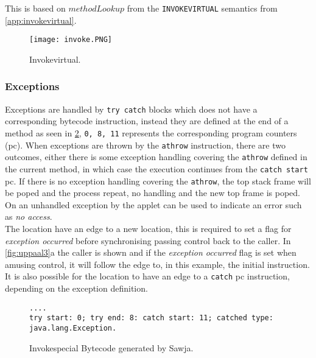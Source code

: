 This is based on $methodLookup$ from the \texttt{INVOKEVIRTUAL} semantics from \cref{app:invokevirtual}.

 
\begin{figure}[H]
\centering
\texttt{[image: invoke.PNG]}
\caption{Invokevirtual.}
\label{fig:invokevirtual}
\end{figure}

\subsubsection{Exceptions}
\label{sec:exceptions}
Exceptions are handled by \texttt{try catch} blocks which does not have a corresponding bytecode instruction, instead they are defined at the end of a method as seen in \cref{lst:exception}, \texttt{0, 8, 11} represents the corresponding program counters (pc).
When exceptions are thrown by the \texttt{athrow} instruction, there are two outcomes, either there is some exception handling covering the \texttt{athrow} defined in the current method, in which case the execution continues from the \texttt{catch start} pc. 
If there is no exception handling covering the \texttt{athrow}, the top stack frame will be poped and the process repeat, no handling and the new top frame is poped. On \jc an unhandled exception by the applet can be used to indicate an error such as \textit{no access}.\\

\noindent The  location have an edge to a new location, this is required to set a flag for \textit{exception occurred} before synchronising passing control back to the caller. In \cref{fig:uppaal3}a the caller is shown and if the \textit{exception occurred} flag is set when amusing control, it will follow the edge to, in this example, the initial instruction. It is also possible for the  location to have an edge to a \texttt{catch} pc instruction, depending on the exception definition.




\begin{figure}
  \begin{lstlisting}
....
try start: 0; try end: 8: catch start: 11; catched type: java.lang.Exception.
  \end{lstlisting}
  \caption{Invokespecial Bytecode generated by Sawja.}
  \label{lst:exception}
\end{figure}



